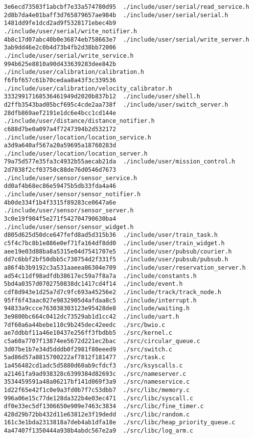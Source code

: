 \documentclass{article}
\begin{document}
\begin{verbatim}
3e6ecd73503f1abcbf7e33a574780d95  ./include/user/serial/read_service.h
2d8b7da4e01baff3d765879657ae984b  ./include/user/serial/serial.h
1481dd9fe1dcd2ad9f5328171ebec4b9  ./include/user/serial/write_notifier.h
4b8c17d07abc40b0e36874eb758663e7  ./include/user/serial/write_server.h
3ab9dd46e2c0b4d73b4fb2d38bb72006  ./include/user/serial/write_service.h
994b625e8810a90d433639283dee842b  ./include/user/calibration/calibration.h
f6fbf657c61b70cedaa8a43f3c339536  ./include/user/calibration/velocity_calibrator.h
33329917168536461949d2020b837b12  ./include/user/shell.h
d2ffb3543bad05bcf695c4cde2aa738f  ./include/user/switch_server.h
28dfb869aef2191e1dc6e4bcc1cd144e  ./include/user/distance/distance_notifier.h
c688d7be0a097a4f7247394b2d532172  ./include/user/location/location_service.h
a3d9a640af567a20a59695a18760283d  ./include/user/location/location_server.h
79a75d577e35fa3c4932b55aecab21da  ./include/user/mission_control.h
2d7038f2cf03750c88de76d0546d7673  ./include/user/sensor/sensor_service.h
dd0af4b68ec86e59475b5db33fda4a46  ./include/user/sensor/sensor_notifier.h
4b0de334f1b4f3315f89283ce0647a6e  ./include/user/sensor/sensor_server.h
3c0e19f904f5e271f542704790630ba4  ./include/user/sensor/sensor_widget.h
d805d625d50dce647fefd8ad5d315b36  ./include/user/train_task.h
c5f4c7bc8b1e886e0ef71fa164df8dd0  ./include/user/train_widget.h
aee19e03d88ba8a5315e04d7541707e5  ./include/user/pubsub/courier.h
dd7c6bbf2bf50dbb5c730754d2f331f5  ./include/user/pubsub/pubsub.h
a86f4b3b9192c3a531aaeea86304e709  ./include/user/reservation_server.h
ad54c11df98adfdb38617ec59a7f8a7a  ./include/constants.h
5bd4a0357d0702750838dc1417cd4f14  ./include/event.h
cdf8d943e1d25a7d7c9fc693a45256e2  ./include/track/track_node.h
95ff6f43aac027e9832905d4afdaa8c5  ./include/interrupt.h
94833a9ccce763038303123e95428de8  ./include/waiting.h
3e9800bc664c0412dc73529ab1d1cc42  ./include/uart.h
7df60a6a44bebe110c9b245dec42eedc  ./src/bwio.c
ae7ddbbf11a46e10437e256ff3fbdbb5  ./src/kernel.c
c5a60a7707f13874ee5672d221ec2bac  ./src/circular_queue.c
3d07be1b7e34d5dddb0f2981f80eeed9  ./src/switch.c
5ad86d57a8815700222af7812f181477  ./src/task.c
1a456482cd1adc5d5880d60ab9cfdcf3  ./src/ksyscalls.c
a21461fa9ad938328c6399384d82693c  ./src/nameserver.c
3534459591a48a06217bf141d069f3a9  ./src/nameservice.c
1d22f65e42f1c0e9a3fd0b7f7c53dbb7  ./src/libc/memory.c
996a06e15c77de128da322b4e03ec471  ./src/libc/syscall.c
df0e33ec5df1306650e909e7463c3834  ./src/libc/fine_timer.c
428d29b72bb432d11e63812e3f19dedd  ./src/libc/random.c
161c3e1bda2313818a7deb4ab1dfa18e  ./src/libc/heap_priority_queue.c
4a47407f1350444a938b4abdc567e2a9  ./src/libc/log_arm.c

\end{verbatim}
\end{document}
